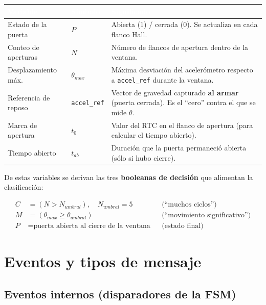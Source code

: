 \documentclass[11pt,a4paper]{article}
\begin{document}
\begin{center}
\renewcommand{\arraystretch}{1.3}
\begin{tabularx}{\linewidth}{@{}l l X@{}}
\toprule
\rowcolor{Indigo0G}
\textcolor{white}{\textbf{Variable}} & \textcolor{white}{\textbf{Símbolo}} &
\textcolor{white}{\textbf{Significado}} \\
\midrule
Estado de la puerta & $P$ & Abierta (1) / cerrada (0). Se actualiza en cada flanco Hall. \\
\rowcolor{Light0G}
Conteo de aperturas & $N$ & Número de flancos de apertura dentro de la ventana. \\
Desplazamiento máx. & $\theta_{max}$ & Máxima desviación del acelerómetro respecto a \texttt{accel\_ref} durante la ventana. \\
\rowcolor{Light0G}
Referencia de reposo & \texttt{accel\_ref} & Vector de gravedad capturado \textbf{al armar} (puerta cerrada). Es el ``cero'' contra el que se mide $\theta$. \\
Marca de apertura & $t_0$ & Valor del RTC en el flanco de apertura (para calcular el tiempo abierto). \\
\rowcolor{Light0G}
Tiempo abierto & $t_{ab}$ & Duración que la puerta permaneció abierta (sólo si hubo cierre). \\
\bottomrule
\end{tabularx}
\end{center}

De estas variables se derivan las tres \textbf{booleanas de decisión} que
alimentan la clasificación:

\begin{align}
C &= (N > N_{umbral}), \quad N_{umbral}=5 && \text{(``muchos ciclos'')}\\
M &= (\theta_{max} \geq \theta_{umbral}) && \text{(``movimiento significativo'')}\\
P &= \text{puerta abierta al cierre de la ventana} && \text{(estado final)}
\end{align}

\section{Eventos y tipos de mensaje}

\subsection{Eventos internos (disparadores de la FSM)}
\end{document}
